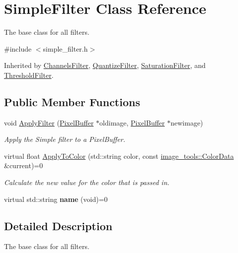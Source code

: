 \hypertarget{classSimpleFilter}{}\section{Simple\+Filter Class Reference}
\label{classSimpleFilter}


The base class for all filters.  




{\ttfamily \#include $<$simple\+\_\+filter.\+h$>$}



Inherited by \hyperlink{classChannelsFilter}{Channels\+Filter}, \hyperlink{classQuantizeFilter}{Quantize\+Filter}, \hyperlink{classSaturationFilter}{Saturation\+Filter}, and \hyperlink{classThresholdFilter}{Threshold\+Filter}.

\subsection*{Public Member Functions}
\begin{DoxyCompactItemize}
\item 
void \hyperlink{classSimpleFilter_a868ae37b1c514199f387890dfa4bf168}{Apply\+Filter} (\hyperlink{classimage__tools_1_1PixelBuffer}{Pixel\+Buffer} $\ast$oldimage, \hyperlink{classimage__tools_1_1PixelBuffer}{Pixel\+Buffer} $\ast$newimage)
\begin{DoxyCompactList}\small\item\em Apply the Simple filter to a Pixel\+Buffer. \end{DoxyCompactList}\item 
virtual float \hyperlink{classSimpleFilter_a4929140e4fa49ea630267e8562c4d0f1}{Apply\+To\+Color} (std\+::string color, const \hyperlink{classimage__tools_1_1ColorData}{image\+\_\+tools\+::\+Color\+Data} \&current)=0
\begin{DoxyCompactList}\small\item\em Calculate the new value for the color that is passed in. \end{DoxyCompactList}\item 
virtual std\+::string {\bfseries name} (void)=0\hypertarget{classSimpleFilter_a9f127f21fb704b891b60cf30685b9dd7}{}\label{classSimpleFilter_a9f127f21fb704b891b60cf30685b9dd7}

\end{DoxyCompactItemize}


\subsection{Detailed Description}
The base class for all filters. 

